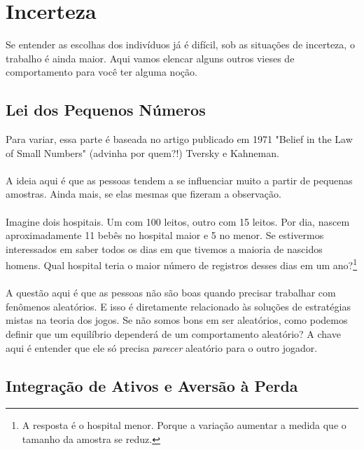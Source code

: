 \documentclass[a4paper,11pt,oneside]{book}
\theoremstyle{definition}
\theoremstyle{break}
\begin{document}
\section{Incerteza}

Se entender as escolhas dos indivíduos já é difícil, sob as situações de incerteza, o trabalho é ainda maior. Aqui vamos elencar alguns outros vieses de comportamento para você ter alguma noção.

\subsection{Lei dos Pequenos Números}

Para variar, essa parte é baseada no artigo publicado em 1971 "Belief in the Law of Small Numbers" (advinha por quem?!) Tversky e Kahneman.
\\
\\
A ideia aqui é que as pessoas tendem a se influenciar muito a partir de pequenas amostras. Ainda mais, se elas mesmas que fizeram a observação.
\\
\\
Imagine dois hospitais. Um com 100 leitos, outro com 15 leitos. Por dia, nascem aproximadamente 11 bebês no hospital maior e 5 no menor. Se estivermos interessados em saber todos os dias em que tivemos a maioria de nascidos homens. Qual hospital teria o maior número de registros desses dias em um ano?\footnote{A resposta é o hospital menor. Porque a variação aumentar a medida que o tamanho da amostra se reduz.}
\\
\\
A questão aqui é que as pessoas não são boas quando precisar trabalhar com fenômenos aleatórios. E isso é diretamente relacionado às soluções de estratégias mistas na teoria dos jogos. Se não somos bons em ser aleatórios, como podemos definir que um equilíbrio dependerá de um comportamento aleatório? A chave aqui é entender que ele só precisa \textit{parecer} aleatório para o outro jogador.


\subsection{Integração de Ativos e Aversão à Perda}
\end{document}
